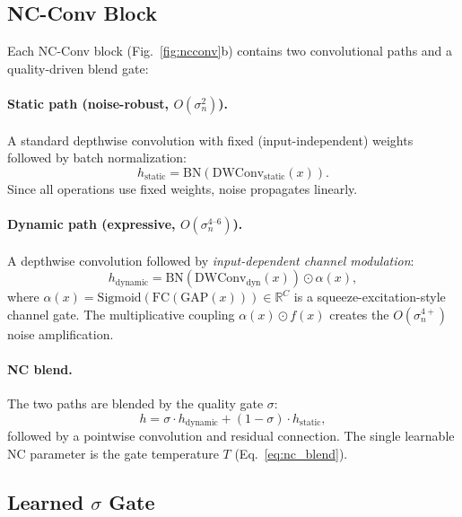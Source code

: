 \documentclass[10pt,twocolumn,letterpaper]{article}
\begin{document}
\subsection{NC-Conv Block}

Each NC-Conv block (Fig.~\ref{fig:ncconv}b) contains two convolutional paths and a quality-driven blend gate:

\paragraph{Static path (noise-robust, $O(\sigma_n^2)$).}
A standard depthwise convolution with fixed (input-independent) weights followed by batch normalization:
\begin{equation}
h_{\text{static}} = \text{BN}(\text{DWConv}_{\text{static}}(x)).
\end{equation}
Since all operations use fixed weights, noise propagates linearly.

\paragraph{Dynamic path (expressive, $O(\sigma_n^{4\text{--}6})$).}
A depthwise convolution followed by \emph{input-dependent channel modulation}:
\begin{equation}
h_{\text{dynamic}} = \text{BN}(\text{DWConv}_{\text{dyn}}(x)) \odot \alpha(x),
\end{equation}
where $\alpha(x) = \text{Sigmoid}(\text{FC}(\text{GAP}(x))) \in \mathbb{R}^C$ is a squeeze-excitation-style~\cite{hu2018squeeze} channel gate.
The multiplicative coupling $\alpha(x) \odot f(x)$ creates the $O(\sigma_n^{4+})$ noise amplification.

\paragraph{NC blend.}
The two paths are blended by the quality gate $\sigma$:
\begin{equation}
h = \sigma \cdot h_{\text{dynamic}} + (1 - \sigma) \cdot h_{\text{static}},
\end{equation}
followed by a pointwise convolution and residual connection.
The single learnable NC parameter is the gate temperature $T$ (Eq.~\ref{eq:nc_blend}).

\subsection{Learned $\sigma$ Gate}
\label{sec:quality}
\end{document}
